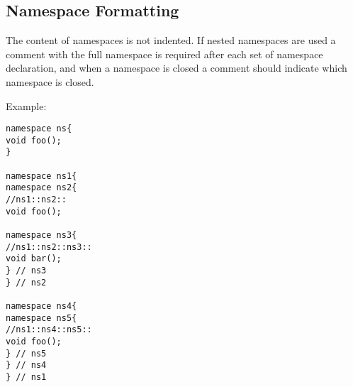 \documentclass[a4paper]{article}
\begin{document}
\subsection{Namespace Formatting}

The content of namespaces is not indented.
If nested namespaces are used a comment with the full namespace is required after each set of namespace declaration,
and when a namespace is closed a comment should indicate which namespace is closed.

Example:
\begin{lstlisting}
namespace ns{
void foo();
}

namespace ns1{
namespace ns2{
//ns1::ns2::
void foo();

namespace ns3{
//ns1::ns2::ns3::
void bar();
} // ns3
} // ns2

namespace ns4{
namespace ns5{
//ns1::ns4::ns5::
void foo();
} // ns5
} // ns4
} // ns1
\end{lstlisting}
\end{document}
